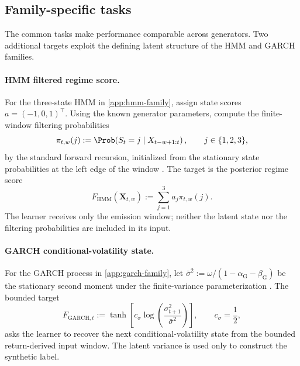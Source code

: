 \subsection{Family-specific tasks}
\label{app:family-specific-functionals}

The common tasks make performance comparable across generators.  Two
additional targets exploit the defining latent structure of the HMM and GARCH
families.

\paragraph{HMM filtered regime score.}
For the three-state HMM in \cref{app:hmm-family}, assign state scores
\(a=(-1,0,1)^\top\).  Using the known generator parameters, compute the
finite-window filtering probabilities
\begin{equation}
    \pi_{t,w}(j)
    :=\Prob\!\left(
      S_t=j\mid X_{t-w+1:t}
    \right),
    \qquad j\in\{1,2,3\},
    \label{eq:functional-hmm-filter}
\end{equation}
by the standard forward recursion, initialized from the stationary state
probabilities at the left edge of the window \citep{BaumPetrie1966}.  The target
is the posterior regime score
\begin{equation}
    F_{\mathrm{HMM}}(\bm X_{t,w})
    :=\sum_{j=1}^3 a_j\pi_{t,w}(j).
    \label{eq:functional-hmm-score}
\end{equation}
The learner receives only the emission window; neither the latent state nor the
filtering probabilities are included in its input.

\paragraph{GARCH conditional-volatility state.}
For the GARCH process in \cref{app:garch-family}, let
\(
  \bar\sigma^2
  :=\omega/(1-\alpha_{\mathrm G}-\beta_{\mathrm G})
\)
be the stationary second moment under the finite-variance parameterization
\citep{Bollerslev1986}.  The bounded target
\begin{equation}
    F_{\mathrm{GARCH},t}
    :=
    \tanh\!\left[
      c_\sigma
      \log\!\left(\frac{\sigma_{t+1}^2}{\bar\sigma^2}\right)
    \right],
    \qquad c_\sigma=\frac12,
    \label{eq:functional-garch-volatility}
\end{equation}
asks the learner to recover the next conditional-volatility state from the
bounded return-derived input window.  The latent variance is used only to
construct the synthetic label.

